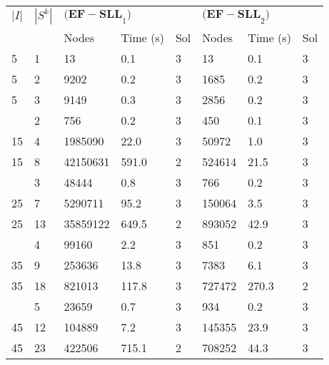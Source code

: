 
\begin{tabularx}{\textwidth}{ll *{6}{Y}}
    \toprule
    $|I|$ & $|S^k|$
        & & \\
    \cmidrule(lr){3-5} \cmidrule(lr){6-8}
    & & Nodes & Time (s) & Sol & Nodes & Time (s) & Sol\\
     & 1 & 13 & 0.1 & 3 & 13 & 0.1 & 3\\
    5 & 2 & 9202 & 0.2 & 3 & 1685 & 0.2 & 3\\
    5 & 3 & 9149 & 0.3 & 3 & 2856 & 0.2 & 3\\
     & 2 & 756 & 0.2 & 3 & 450 & 0.1 & 3\\
    15 & 4 & 1985090 & 22.0 & 3 & 50972 & 1.0 & 3\\
    15 & 8 & 42150631 & 591.0 & 2 & 524614 & 21.5 & 3\\
     & 3 & 48444 & 0.8 & 3 & 766 & 0.2 & 3\\
    25 & 7 & 5290711 & 95.2 & 3 & 150064 & 3.5 & 3\\
    25 & 13 & 35859122 & 649.5 & 2 & 893052 & 42.9 & 3\\
     & 4 & 99160 & 2.2 & 3 & 851 & 0.2 & 3\\
    35 & 9 & 253636 & 13.8 & 3 & 7383 & 6.1 & 3\\
    35 & 18 & 821013 & 117.8 & 3 & 727472 & 270.3 & 2\\
     & 5 & 23659 & 0.7 & 3 & 934 & 0.2 & 3\\
    45 & 12 & 104889 & 7.2 & 3 & 145355 & 23.9 & 3\\
    45 & 23 & 422506 & 715.1 & 2 & 708252 & 44.3 & 3\\
    \bottomrule
\end{tabularx}

